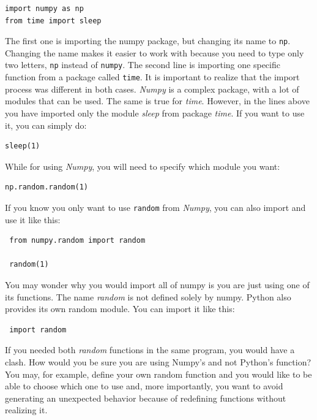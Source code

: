 \begin{verbatim}
import numpy as np
from time import sleep
\end{verbatim}

The first one is importing the numpy package, but changing its name to \texttt{np}. Changing the name makes it easier to work with because you need to type only two letters, \texttt{np} instead of \texttt{numpy}. The second line is importing one specific function from a package called \texttt{time}. It is important to realize that the import process was different in both cases. \emph{Numpy} is a
complex package, with a lot of modules that can be used. The same is true for \emph{time}. However, in the lines above you have imported only the module \emph{sleep} from package \emph{time}. If you want to use it, you can simply do:

\begin{verbatim}
sleep(1)
\end{verbatim}

While for using \emph{Numpy}, you will need to specify which module you want:

\begin{verbatim}
np.random.random(1)
\end{verbatim}

If you know you only want to use \texttt{random} from \emph{Numpy}, you can also import and use it like this:

\begin{verbatim}
 from numpy.random import random
 
 random(1)
\end{verbatim}

You may wonder why you would import all of numpy is you are just using one of its functions. The name \emph{random} is not defined solely by numpy. Python also provides its own random module. You can import it like this:

\begin{verbatim}
 import random
\end{verbatim}

If you needed both \emph{random} functions in the same program, you would have a clash. How would you be sure you are using Numpy's and not Python's function? You may, for example, define your own random function and you would like to be able to choose which one to use and, more importantly, you want to avoid generating an unexpected behavior because of redefining functions without realizing it. 

